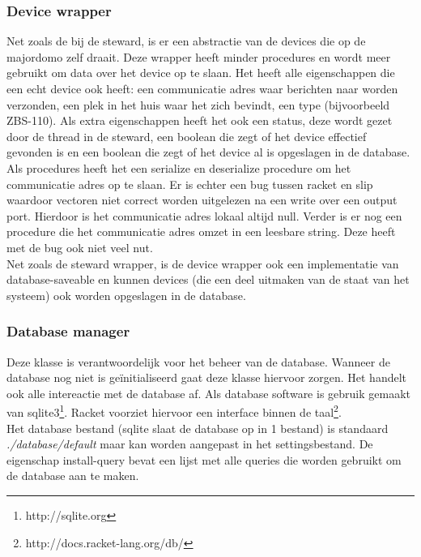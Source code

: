 \documentclass{article}
\begin{document}
\subsubsection{Device wrapper}
\label{ssub:device-wrapper}
Net zoals de bij de steward, is er een abstractie van de devices die op de majordomo zelf draait. Deze wrapper heeft minder procedures en wordt meer gebruikt om data over het device op te slaan. Het heeft alle eigenschappen die een echt device ook heeft: een communicatie adres waar berichten naar worden verzonden, een plek in het huis waar het zich bevindt, een type (bijvoorbeeld ZBS-110). Als extra eigenschappen heeft het ook een status, deze wordt gezet door de thread in de steward, een boolean die zegt of het device effectief gevonden is en een boolean die zegt of het device al is opgeslagen in de database.\\
Als procedures heeft het een serialize en deserialize procedure om het communicatie adres op te slaan. Er is echter een bug tussen racket en slip waardoor vectoren niet correct worden uitgelezen na een write over een output port. Hierdoor is het communicatie adres lokaal altijd null. Verder is er nog een procedure die het communicatie adres omzet in een leesbare string. Deze heeft met de bug ook niet veel nut.\\
Net zoals de steward wrapper, is de device wrapper ook een implementatie van database-saveable en kunnen devices (die een deel uitmaken van de staat van het systeem) ook worden opgeslagen in de database.

\subsubsection{Database manager}
\label{ssub:database-manager}
Deze klasse is verantwoordelijk voor het beheer van de database. Wanneer de database nog niet is ge\"initialiseerd gaat deze klasse hiervoor zorgen. Het handelt ook alle intereactie met de database af. Als database software is gebruik gemaakt van sqlite3\footnote{http://sqlite.org}. Racket voorziet hiervoor een interface binnen de taal\footnote{http://docs.racket-lang.org/db/}.\\
Het database bestand (sqlite slaat de database op in 1 bestand) is standaard \emph{./database/default} maar kan worden aangepast in het settingsbestand. De eigenschap install-query bevat een lijst met alle queries die worden gebruikt om de database aan te maken.

\end{document}
